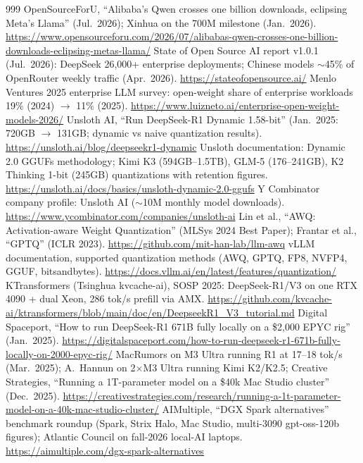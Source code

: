\begin{thebibliography}{999}
 OpenSourceForU, ``Alibaba's Qwen crosses one billion downloads, eclipsing Meta's Llama'' (Jul.\ 2026); Xinhua on the 700M milestone (Jan.\ 2026). \url{https://www.opensourceforu.com/2026/07/alibabas-qwen-crosses-one-billion-downloads-eclipsing-metas-llama/}
 State of Open Source AI report v1.0.1 (Jul.\ 2026): DeepSeek 26,000+ enterprise deployments; Chinese models $\sim$45\% of OpenRouter weekly traffic (Apr.\ 2026). \url{https://stateofopensource.ai/}
 Menlo Ventures 2025 enterprise LLM survey: open-weight share of enterprise workloads 19\% (2024) $\rightarrow$ 11\% (2025). \url{https://www.luizneto.ai/enterprise-open-weight-models-2026/}
 Unsloth AI, ``Run DeepSeek-R1 Dynamic 1.58-bit'' (Jan.\ 2025: 720GB $\rightarrow$ 131GB; dynamic vs naive quantization results). \url{https://unsloth.ai/blog/deepseekr1-dynamic}
 Unsloth documentation: Dynamic 2.0 GGUFs methodology; Kimi K3 (594GB--1.5TB), GLM-5 (176--241GB), K2 Thinking 1-bit (245GB) quantizations with retention figures. \url{https://unsloth.ai/docs/basics/unsloth-dynamic-2.0-ggufs}
 Y Combinator company profile: Unsloth AI ($\sim$10M monthly model downloads). \url{https://www.ycombinator.com/companies/unsloth-ai}
 Lin et al., ``AWQ: Activation-aware Weight Quantization'' (MLSys 2024 Best Paper); Frantar et al., ``GPTQ'' (ICLR 2023). \url{https://github.com/mit-han-lab/llm-awq}
 vLLM documentation, supported quantization methods (AWQ, GPTQ, FP8, NVFP4, GGUF, bitsandbytes). \url{https://docs.vllm.ai/en/latest/features/quantization/}
 KTransformers (Tsinghua kvcache-ai), SOSP 2025: DeepSeek-R1/V3 on one RTX 4090 + dual Xeon, 286 tok/s prefill via AMX. \url{https://github.com/kvcache-ai/ktransformers/blob/main/doc/en/DeepseekR1_V3_tutorial.md}
 Digital Spaceport, ``How to run DeepSeek-R1 671B fully locally on a \$2,000 EPYC rig'' (Jan.\ 2025). \url{https://digitalspaceport.com/how-to-run-deepseek-r1-671b-fully-locally-on-2000-epyc-rig/}
 MacRumors on M3 Ultra running R1 at 17--18 tok/s (Mar.\ 2025); A.~Hannun on 2$\times$M3 Ultra running Kimi K2/K2.5; Creative Strategies, ``Running a 1T-parameter model on a \$40k Mac Studio cluster'' (Dec.\ 2025). \url{https://creativestrategies.com/research/running-a-1t-parameter-model-on-a-40k-mac-studio-cluster/}
 AIMultiple, ``DGX Spark alternatives'' benchmark roundup (Spark, Strix Halo, Mac Studio, multi-3090 gpt-oss-120b figures); Atlantic Council on fall-2026 local-AI laptops. \url{https://aimultiple.com/dgx-spark-alternatives}

\end{thebibliography}
